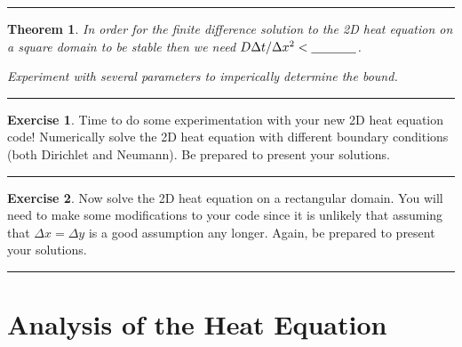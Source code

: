 \documentclass[
]{book}
\newtheorem{theorem}{Theorem}[chapter]
\theoremstyle{definition}
\theoremstyle{definition}
\theoremstyle{definition}
\newtheorem{exercise}{Exercise}[chapter]
\theoremstyle{remark}
\begin{document}
\begin{center}\rule{0.5\linewidth}{0.5pt}\end{center}

\begin{theorem}
\protect\hypertarget{thm:unnamed-chunk-563}{}{\label{thm:unnamed-chunk-563} }In order for the finite difference solution to the 2D heat equation on a square domain to be stable then we need \(D \Delta t / \Delta x^2 < \underline{\hspace{0.5in}}\).

Experiment with several parameters to imperically determine the bound.
\end{theorem}

\begin{center}\rule{0.5\linewidth}{0.5pt}\end{center}

\begin{exercise}
\protect\hypertarget{exr:unnamed-chunk-564}{}{\label{exr:unnamed-chunk-564} }Time to do some experimentation with your new 2D heat equation code! Numerically solve the 2D heat equation with different boundary conditions (both Dirichlet and Neumann). Be prepared to present your solutions.
\end{exercise}

\begin{center}\rule{0.5\linewidth}{0.5pt}\end{center}

\begin{exercise}
\protect\hypertarget{exr:unnamed-chunk-565}{}{\label{exr:unnamed-chunk-565} }Now solve the 2D heat equation on a rectangular domain. You will need to make some modifications to your code since it is unlikely that assuming that \(\Delta x = \Delta y\) is a good assumption any longer. Again, be prepared to present your solutions.
\end{exercise}

\begin{center}\rule{0.5\linewidth}{0.5pt}\end{center}

\hypertarget{analysis-of-the-heat-equation}{%
\section{Analysis of the Heat Equation}\label{analysis-of-the-heat-equation}}
\end{document}
